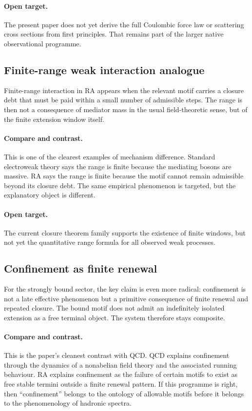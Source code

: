 \documentclass[11pt]{article}
\begin{document}
\paragraph{Open target.} The present paper does not yet derive the full Coulombic force law or scattering cross sections from first principles. That remains part of the larger native observational programme.

\subsection{Finite-range weak interaction analogue}

Finite-range interaction in RA appears when the relevant motif carries a closure debt that must be paid within a small number of admissible steps. The range is then not a consequence of mediator mass in the usual field-theoretic sense, but of the finite extension window itself.

\paragraph{Compare and contrast.} This is one of the clearest examples of mechanism difference. Standard electroweak theory says the range is finite because the mediating bosons are massive. RA says the range is finite because the motif cannot remain admissible beyond its closure debt. The same empirical phenomenon is targeted, but the explanatory object is different.

\paragraph{Open target.} The current closure theorem family supports the existence of finite windows, but not yet the quantitative range formula for all observed weak processes.

\subsection{Confinement as finite renewal}

For the strongly bound sector, the key claim is even more radical: confinement is not a late effective phenomenon but a primitive consequence of finite renewal and repeated closure. The bound motif does not admit an indefinitely isolated extension as a free terminal object. The system therefore stays composite.

\paragraph{Compare and contrast.} This is the paper's cleanest contrast with QCD. QCD explains confinement through the dynamics of a nonabelian field theory and the associated running behaviour. RA explains confinement as the failure of certain motifs to exist as free stable termini outside a finite renewal pattern. If this programme is right, then ``confinement'' belongs to the ontology of allowable motifs before it belongs to the phenomenology of hadronic spectra.
\end{document}
